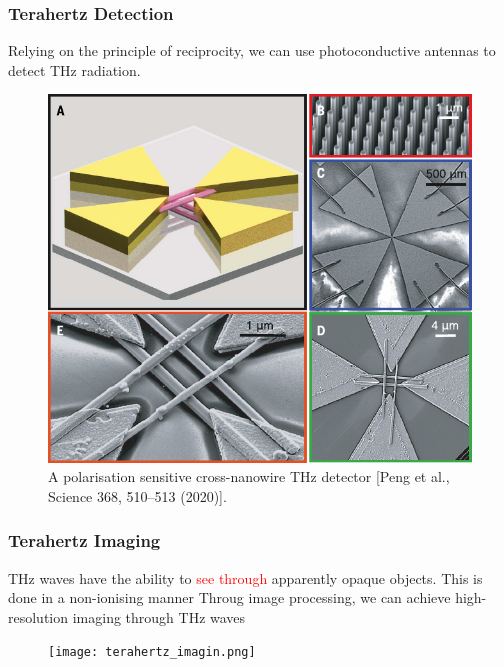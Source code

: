 \documentclass[10pt]{beamer}
\begin{document}
\begin{frame}
    \frametitle{Terahertz Detection}
    Relying on the principle of reciprocity, we can use photoconductive antennas to detect THz radiation.
    \begin{figure}[h!]
        \centering
        \includegraphics[width=.45\textwidth]{terahertz_applications.pdf}
        \caption{A polarisation sensitive cross-nanowire THz detector \tiny{[Peng et al., Science 368, 510–513 (2020)]}.}
    \end{figure}
\end{frame}

\begin{frame}
    \frametitle{Terahertz Imaging}
    \begin{outline}
        \1 THz waves have the ability to \textcolor{red}{see through} apparently opaque objects.
        \1 This is done in a non-ionising manner
        \1 Throug image processing, we can achieve high-resolution imaging through THz waves
    \end{outline}
    \begin{figure}[h!]
        \centering
        \texttt{[image: terahertz\_imagin.png]}
    \end{figure}
\end{frame}
\end{document}
